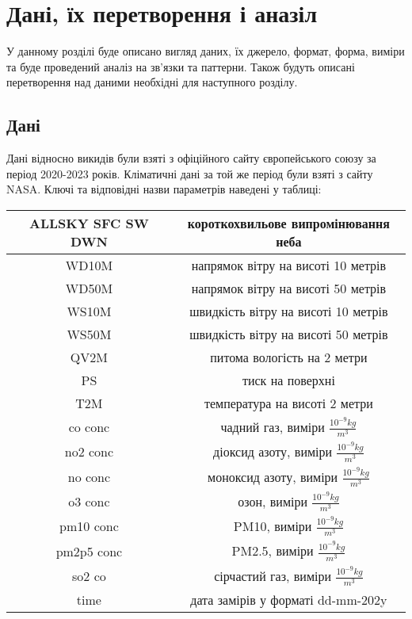 \chapter{Дані, їх перетворення і аназіл}

У данному розділі буде описано вигляд даних, їх джерело, формат, форма, виміри та буде проведений аналіз на зв'язки та паттерни.
Також будуть описані перетворення над даними необхідні для наступного розділу.

\section{Дані}

Дані відносно викидів були взяті з офіційного сайту європейського союзу за період 2020-2023 років.
Кліматичні дані за той же період були взяті з сайту NASA. 
Ключі та відповідні назви параметрів наведені у таблиці:


\begin{center}
    \begin{tabular}{|c | c|}
        \hline
        ALLSKY SFC SW DWN & короткохвильове випромінювання неба \\
        \hline
        WD10M & напрямок вітру на висоті 10 метрів \\ 
        \hline
        WD50M & напрямок вітру на висоті 50 метрів \\
        \hline
        WS10M & швидкість вітру на висоті 10 метрів \\
        \hline
        WS50M & швидкість вітру на висоті 50 метрів  \\
        \hline
        QV2M & питома вологість на 2 метри \\
        \hline
        PS & тиск на поверхні \\
        \hline
        T2M & температура на висоті 2 метри \\
        \hline
        co conc & чадний газ, виміри $\frac{10^{-9}kg}{m^{3}}$ \\
        \hline
        no2 conc & діоксид азоту, виміри $\frac{10^{-9}kg}{m^{3}}$ \\
        \hline
        no conc & моноксид азоту, виміри $\frac{10^{-9}kg}{m^{3}}$ \\
        \hline
        o3 conc & озон, виміри $\frac{10^{-9}kg}{m^{3}}$  \\
        \hline
        pm10 conc & PM10, виміри $\frac{10^{-9}kg}{m^{3}}$ \\
        \hline
        pm2p5 conc & PM2.5, виміри $\frac{10^{-9}kg}{m^{3}}$ \\
        \hline
        so2 co & сірчастий газ, виміри $\frac{10^{-9}kg}{m^{3}}$ \\
        \hline
        time & дата замірів у форматі dd-mm-202y \\
        \hline
    \end{tabular}
    
    \vspace{1cm}
\end{center}


